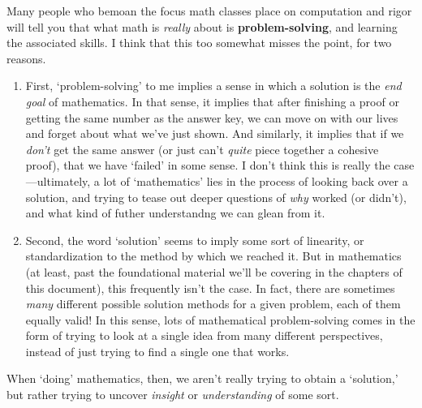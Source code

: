 \documentclass[10pt]{article}
\theoremstyle{definition}
\begin{document}
Many people who bemoan the focus math classes place on computation and rigor will tell you that what math is \emph{really} about is \textbf{problem-solving}, and learning the associated skills.  I think that this too somewhat misses the point, for two reasons.  
\begin{enumerate}
\item First, `problem-solving' to me implies a sense in which a solution is the \emph{end goal} of mathematics.  In that sense, it implies that after finishing a proof or getting the same number as the answer key, we can move on with our lives and forget about what we've just shown.  And similarly, it implies that if we \emph{don't} get the same answer (or just can't \emph{quite} piece together a cohesive proof), that we have `failed' in some sense.  I don't think this is really the case---ultimately, a lot of `mathematics' lies in the process of looking back over a solution, and trying to tease out deeper questions of \emph{why} worked (or didn't), and what kind of futher understandng we can glean from it.  
\item Second, the word `solution' seems to imply some sort of linearity, or standardization to the method by which we reached it.  But in mathematics (at least, past the foundational material we'll be covering in the chapters of this document), this frequently isn't the case.  In fact, there are sometimes \emph{many} different possible solution methods for a given problem, each of them equally valid!  In this sense, lots of mathematical problem-solving comes in the form of trying to look at a single idea from many different perspectives, instead of just trying to find a single one that works.  
\end{enumerate}
When `doing' mathematics, then, we aren't really trying to obtain a `solution,' but rather trying to uncover \emph{insight} or \emph{understanding} of some sort.  
\end{document}
